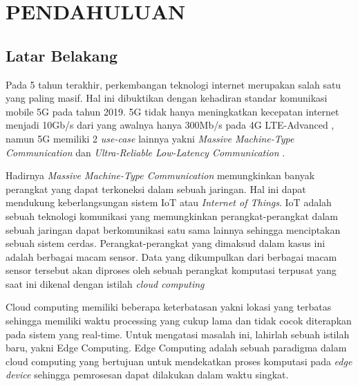 \chapter{PENDAHULUAN}
\setcounter{page}{1}


\section{Latar Belakang}

Pada 5 tahun terakhir, perkembangan teknologi internet merupakan salah satu yang paling masif.
Hal ini dibuktikan dengan kehadiran standar komunikasi mobile 5G pada tahun 2019. 5G tidak hanya meningkatkan kecepatan internet menjadi
10Gb/s dari yang awalnya hanya 300Mb/s pada 4G LTE-Advanced \cite{4g}, namun 5G memiliki 2 \textit{use-case} lainnya
yakni \textit{Massive Machine-Type Communication} dan \textit{Ultra-Reliable Low-Latency Communication} \cite{5g}. 


Hadirnya \textit{Massive Machine-Type Communication} memungkinkan banyak perangkat yang dapat terkoneksi dalam sebuah jaringan.
Hal ini dapat mendukung keberlangsungan sistem IoT atau \textit{Internet of Things}. IoT adalah sebuah teknologi komunikasi
yang memungkinkan perangkat-perangkat dalam sebuah jaringan dapat berkomunikasi satu sama lainnya sehingga menciptakan sebuah sistem cerdas.
Perangkat-perangkat yang dimaksud dalam kasus ini adalah berbagai macam sensor. Data yang dikumpulkan dari berbagai macam sensor tersebut akan diproses
oleh sebuah perangkat komputasi terpusat yang saat ini dikenal dengan istilah \textit{cloud computing}

Cloud computing memiliki beberapa keterbatasan yakni lokasi yang terbatas sehingga memiliki waktu processing yang cukup lama
dan tidak cocok diterapkan pada sistem yang real-time. Untuk mengatasi masalah ini, lahirlah sebuah istilah baru, yakni Edge Computing.
Edge Computing adalah sebuah paradigma dalam cloud computing yang bertujuan untuk mendekatkan proses komputasi pada \textit{edge device}
sehingga pemrosesan dapat dilakukan dalam waktu singkat.

